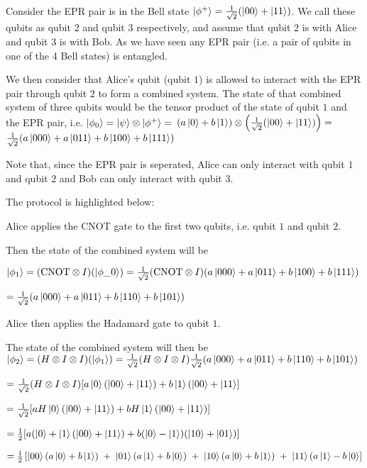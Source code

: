 \documentclass[12pt,twoside,fleqn]{report}
\theoremstyle{thmstyle}
\newenvironment{step}[1]
  {\renewcommand\theinnerstep{#1}\innerstep}
{\endinnerstep}
\begin{document}
Consider the EPR pair is in the Bell state $\ket{\phi^+} = \frac{1}{\sqrt{2}} ( \ket{00} + \ket{11} ) $. We call these qubits as qubit $2$ and qubit $3$ respectively, and assume that qubit $2$ is with Alice and qubit $3$ is with Bob. As we have seen any EPR pair (i.e. a pair of qubits in one of the 4 Bell states) is entangled.


We then consider that Alice's qubit (qubit $1$) is allowed to interact with the EPR pair through qubit $2$ to form a combined system. The state of that combined system of three qubits would be the tensor product of the state of qubit $1$ and the EPR pair, i.e. $\ket{\phi_0} = \ket\psi \otimes \ket{\phi^+} =$
    $ ( a \ket{0} + b \ket{1} ) \otimes \left (\frac{1}{\sqrt{2}} (\ket{00} + \ket{11}) \right ) = $
    $ \frac{1}{\sqrt{2}} (a \ket{000} + a \ket{011} + b \ket{100} + b \ket{111} )$

Note that, since the EPR pair is seperated, Alice can only interact with qubit $1$ and qubit $2$ and Bob can only interact with qubit $3$.


The protocol is highlighted below:
\begin{step}{1}

Alice applies the CNOT gate to the first two qubits, i.e. qubit $1$ and qubit $2$.

Then the state of the combined system will be 

    $\ket{\phi_1} = (\text{CNOT} \otimes I) (\ket{\phi\_0}) = \frac{1}{\sqrt{2}} (\text{CNOT} \otimes I) (a \ket{000} + a \ket{011} + b \ket{100} + b \ket{111} )$

$ = \frac{1}{\sqrt{2}} (a \ket{000} + a \ket{011} + b \ket{110} + b \ket{101})$

\end{step}

\begin{step}{2} Alice then applies the Hadamard gate to qubit $1$.

The state of the combined system will then be $\ket{\phi_2} = (H \otimes I \otimes I) (\ket{\phi_1}) = \frac{1}{\sqrt{2}} (H \otimes I \otimes I) \frac{1}{\sqrt{2}} (a \ket{000} + a \ket{011} + b \ket{110} + b \ket{101})$

    $ = \frac{1}{\sqrt{2}} (H \otimes I \otimes I) [a \ket{0} (\ket{00} + \ket{11}) + b \ket{1} (\ket{00} + \ket{11}]$

    $ = \frac{1}{\sqrt{2}} [a H \ket{0} (\ket{00} + \ket{11}) + b H \ket{1} (\ket{00} + \ket{11}) ]$

    $ = \frac{1}{2} [a (\ket{0} + \ket{1} (\ket{00} + \ket{11}) + b (\ket{0} - \ket{1}) (\ket{10} + \ket{01}) ] $

$ = \frac{1}{2} \left [ \ket{00} (a \ket{0} + b \ket{1}) \; + \; \ket{01} ( a \ket{1} + b \ket{0} ) \; + \; \ket{10} (a \ket{0} + b \ket{1} ) \; + \; \ket{11} (a \ket{1} - b \ket{0} \right]$


\end{step}
\end{document}
